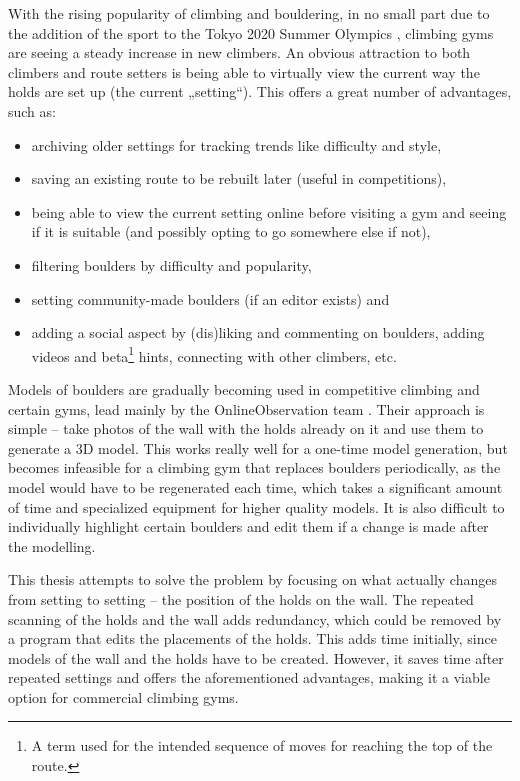 
With the rising popularity of climbing and bouldering, in no small part due to the addition of the sport to the Tokyo 2020 Summer Olympics \cite{olympics}, climbing gyms are seeing a steady increase in new climbers.
An obvious attraction to both climbers and route setters is being able to virtually view the current way the holds are set up (the current „setting“).
This offers a great number of advantages, such as:

\begin{itemize}
	\item archiving older settings for tracking trends like difficulty and style,
	\item saving an existing route to be rebuilt later (useful in competitions),
	\item being able to view the current setting online before visiting a gym and seeing if it is suitable (and possibly opting to go somewhere else if not),
	\item filtering boulders by difficulty and popularity,
	\item setting community-made boulders (if an editor exists) and
	\item adding a social aspect by (dis)liking and commenting on boulders, adding videos and beta\footnote{A term used for the intended sequence of moves for reaching the top of the route.} hints, connecting with other climbers, etc.
\end{itemize}

Models of boulders are gradually becoming used in competitive climbing and certain gyms, lead mainly by the OnlineObservation team \cite{onlineobservation}.
Their approach is simple -- take photos of the wall with the holds already on it and use them to generate a 3D model.
This works really well for a one-time model generation, but becomes infeasible for a climbing gym that replaces boulders periodically, as the model would have to be regenerated each time, which takes a significant amount of time and specialized equipment for higher quality models.
It is also difficult to individually highlight certain boulders and edit them if a change is made after the modelling.

This thesis attempts to solve the problem by focusing on what actually changes from setting to setting -- the position of the holds on the wall.
The repeated scanning of the holds and the wall adds redundancy, which could be removed by a program that edits the placements of the holds.
This adds time initially, since models of the wall and the holds have to be created.
However, it saves time after repeated settings and offers the aforementioned advantages, making it a viable option for commercial climbing gyms.

